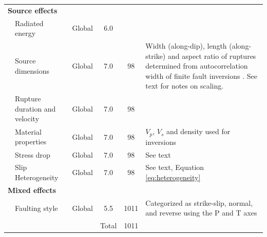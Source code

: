 \documentclass[draft, jgrga]{agujournal2018}
\begin{document}
\begin{table}[]
\begin{threeparttable}
\begin{tabular}{@{}lp{2cm}p{1cm}ccp{6.5cm}@{}}
\multicolumn{2}{l}{\textbf{Source effects}} &              &       &      &                                                                                                                                                                                                            \\
          & Radiated energy\tnote{5}        & Global       & 6.0   &      &                                                                                                                                                                                                            \\
          & Source dimensions\tnote{6}      & Global       & 7.0   & 98   & Width (along-dip), length (along-strike) and aspect ratio of ruptures determined from autocorrelation width of finite fault inversions \citep[following][]{mai2000}. See text for notes on scaling.                                 \\
          & Rupture duration and velocity\tnote{7}& Global  & 7.0   & 98   &                                                                                                                                                                                                            \\
          & Material properties\tnote{7}    & Global       & 7.0   & 98   & $V_p$, $V_s$ and density used for inversions                                                                                                                                                         \\
          & Stress drop\tnote{6}            & Global       & 7.0   & 98   & See text                                                                                                                                                                                                  \\
          & Slip Heterogeneity\tnote{6}          & Global       & 7.0   & 98   & See text, Equation \ref{eq:heterogeneity}                                                                                                                                                                                                   \\
\multicolumn{2}{l}{\textbf{Mixed effects}}  &              &       &      &                                                                                                                                                                                                            \\
          & Faulting style\tnote{8}         & Global       & 5.5   & 1011 & Categorized as strike-slip, normal, and reverse using the P and T axes                                                                                                                                     \\ \midrule
          &                                 &              & Total & 1011 &
\end{tabular}%


\end{threeparttable}
\end{table}
\end{document}
